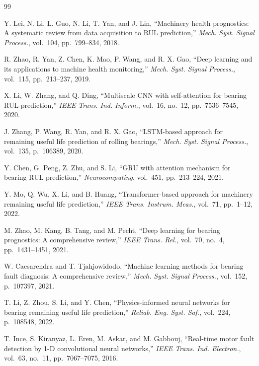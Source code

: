 \documentclass[5p,twocolumn]{elsarticle}
\begin{document}

\begin{thebibliography}{99}

Y. Lei, N. Li, L. Guo, N. Li, T. Yan, and J. Lin,
``Machinery health prognostics: A systematic review from data acquisition to RUL prediction,''
\textit{Mech. Syst. Signal Process.}, vol.~104, pp.~799--834, 2018.

R. Zhao, R. Yan, Z. Chen, K. Mao, P. Wang, and R. X. Gao,
``Deep learning and its applications to machine health monitoring,''
\textit{Mech. Syst. Signal Process.}, vol.~115, pp.~213--237, 2019.

X. Li, W. Zhang, and Q. Ding,
``Multiscale CNN with self-attention for bearing RUL prediction,''
\textit{IEEE Trans. Ind. Inform.}, vol.~16, no.~12, pp.~7536--7545, 2020.

J. Zhang, P. Wang, R. Yan, and R. X. Gao,
``LSTM-based approach for remaining useful life prediction of rolling bearings,''
\textit{Mech. Syst. Signal Process.}, vol.~135, p.~106389, 2020.

Y. Chen, G. Peng, Z. Zhu, and S. Li,
``GRU with attention mechanism for bearing RUL prediction,''
\textit{Neurocomputing}, vol.~451, pp.~213--224, 2021.

Y. Mo, Q. Wu, X. Li, and B. Huang,
``Transformer-based approach for machinery remaining useful life prediction,''
\textit{IEEE Trans. Instrum. Meas.}, vol.~71, pp.~1--12, 2022.

M. Zhao, M. Kang, B. Tang, and M. Pecht,
``Deep learning for bearing prognostics: A comprehensive review,''
\textit{IEEE Trans. Rel.}, vol.~70, no.~4, pp.~1431--1451, 2021.

W. Caesarendra and T. Tjahjowidodo,
``Machine learning methods for bearing fault diagnosis: A comprehensive review,''
\textit{Mech. Syst. Signal Process.}, vol.~152, p.~107397, 2021.

T. Li, Z. Zhou, S. Li, and Y. Chen,
``Physics-informed neural networks for bearing remaining useful life prediction,''
\textit{Reliab. Eng. Syst. Saf.}, vol.~224, p.~108548, 2022.

T. Ince, S. Kiranyaz, L. Eren, M. Askar, and M. Gabbouj,
``Real-time motor fault detection by 1-D convolutional neural networks,''
\textit{IEEE Trans. Ind. Electron.}, vol.~63, no.~11, pp.~7067--7075, 2016.


\end{thebibliography}
\end{document}
